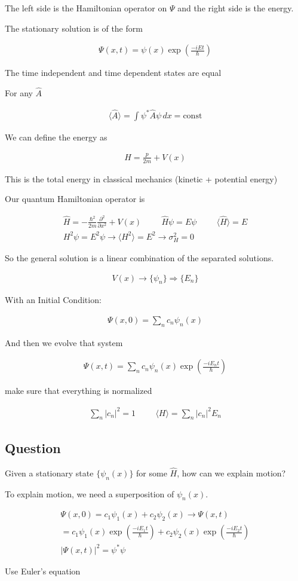 \documentclass[fleqn]{report}
\newcommand{\hp}{\hspace{1cm}}
\newcommand{\del}{\partial}
\newcommand{\equations} [1] {
\begin{gather*}
#1
\end{gather*}
}
\begin{document}
The left side is the Hamiltonian operator on $\Psi$ 
and the right side is the energy.

The stationary solution is of the form 
\equations{
    \Psi(x, t)
    =
    \psi(x)
    \exp(\frac{-i E t}{\hbar})
}

The time independent and time dependent states are equal 

For any $\hat A$ 
\equations{
    \langle \hat A \rangle 
    =
    \int 
    \psi^* \hat A \psi \, dx
    =
    \textrm{const}
}

We can define the energy as 

\equations{
    H 
    =
    \frac{p}{2m}
    +
    V(x)
}
This is the total energy in classical mechanics (kinetic + potential energy)

Our quantum Hamiltonian operator is 
\equations{
    \hat H 
    =
    - \frac{\hbar^2}{2m}
    \frac{\del^2}{\del x^2}
    +
    V(x)
    \hp 
    \hat H \psi = E \psi 
    \hp 
    \langle \hat H \rangle 
    =
    E
    \\
    H^2 \psi 
    =
    E^2 \psi 
    \rightarrow 
    \langle H^2 \rangle 
    =
    E^2
    \rightarrow 
    \sigma_H^2
    = 0
}

So the general solution is a linear combination of the separated 
solutions. 

\equations{
    V(x)
    \rightarrow 
    \{ \psi_n \}
    \Rightarrow 
    \{ E_n \}
}

With an Initial Condition: 

\equations{
    \Psi(x, 0)
    =
    \sum_n c_n \psi_n(x)
}

And then we evolve that system 
\equations{
    \Psi(x, t)
    =
    \sum_n 
    c_n \psi_n(x) \exp(\frac{-i E_n t}{\hbar})
}

make sure that everything is normalized 
\equations{
    \sum_n |c_n|^2 = 1
    \hp 
    \langle H \rangle 
    =
    \sum_n
    |c_n|^2 E_n
}

\subsection{Question}
Given a stationary state $\{ \psi_n(x) \}$ for some $\hat H$, how 
can we explain motion?

To explain motion, we need a superposition of $\psi_n(x)$.

\equations{
    \Psi(x, 0)
    =
    c_1 \psi_1(x)
    +
    c_2 
    \psi_2(x)
    \rightarrow 
    \Psi(x, t)
    \\
    =
    c_1 \psi_1(x) \exp(\frac{-i E_1 t}{\hbar})
    +
    c_2 \psi_2(x) \exp(\frac{-i E_2 t}{\hbar})
    \\
    |\Psi(x, t)|^2
    =
    \psi^* \psi
}
Use Euler's equation
\end{document}
